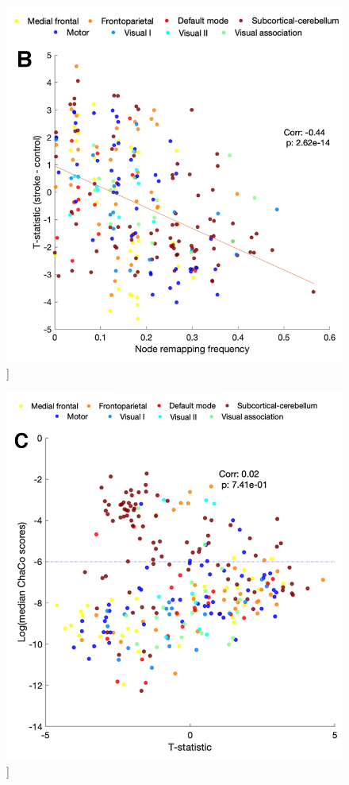 \documentclass[phd,tocprelim]{cornell}
\renewcommand{\caption}[1]{\singlespacing\hangcaption{#1}\normalspacing}
\begin{document}
\begin{figure}[h!]
		\ContinuedFloat
		\captionsetup{labelformat=adja-page}
    \centering
    \includegraphics[width=\textwidth]{chapter1/Figure4B.png}
    \caption[]{}
\end{figure}
\null
\vfill
\clearpage
\null
\vfill
\begin{figure}[h!]
		\ContinuedFloat
		\captionsetup{labelformat=adja-page}
    \centering
    \includegraphics[width=\textwidth]{chapter1/Figure4C.png}
    \caption[]{}
\end{figure}
\end{document}
